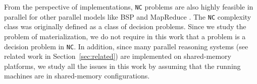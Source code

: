 From the perspective of implementations, \texttt{NC} problems are also
highly feasible in parallel for other parallel models like BSP \cite{Valiant90}
and MapReduce \cite{KarloffSV10}. The \texttt{NC} complexity class was originally defined
as a class of decision problems. Since we study the problem of materialization, we do not
require in this work that a problem is a decision problem in \texttt{NC}.
In addition, since many parallel reasoning systems (see related work in Section~\ref{sec:related})
are implemented on shared-memory platforms, we
study all the issues in this work by assuming that the running machines are in
shared-memory configurations.



